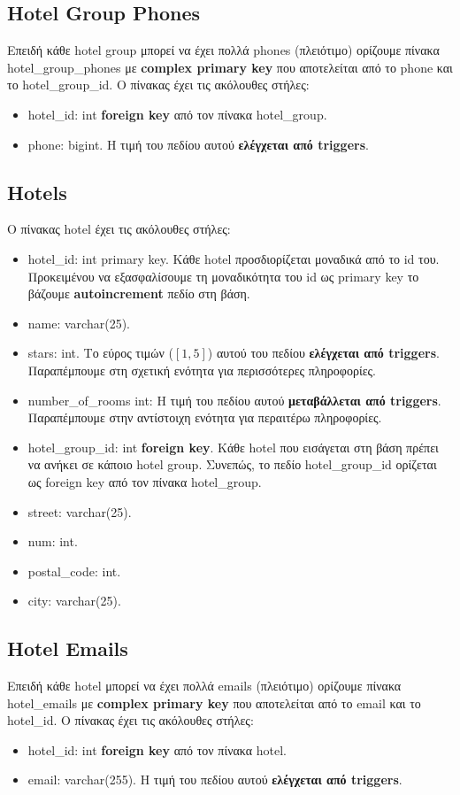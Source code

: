\documentclass[a4paper,oneside, 11pt]{article}
\begin{document}
\subsection{Hotel Group Phones}
Επειδή κάθε hotel group μπορεί να έχει πολλά phones (πλειότιμο) ορίζουμε πίνακα hotel\_group\_phones με \textbf{complex primary key} που αποτελείται από το phone και το hotel\_group\_id. Ο πίνακας έχει τις ακόλουθες στήλες:
\begin{itemize}
\item hotel\_id: int \textbf{foreign key} από τον πίνακα hotel\_group.
\item phone: bigint. Η τιμή του πεδίου αυτού \textbf{ελέγχεται από triggers}.
\end{itemize}
\subsection{Hotels}
Ο πίνακας hotel έχει τις ακόλουθες στήλες:
\begin{itemize}
\item hotel\_id: int primary key. Κάθε hotel προσδιορίζεται μοναδικά από το id του. Προκειμένου να εξασφαλίσουμε τη μοναδικότητα του id ως primary key το βάζουμε \textbf{autoincrement} πεδίο στη βάση.
\item name: varchar(25). 
\item stars: int. Το εύρος τιμών ($[1,5]$) αυτού του πεδίου \textbf{ελέγχεται από triggers}. Παραπέμπουμε στη σχετική ενότητα για περισσότερες πληροφορίες.
\item number\_of\_rooms int: Η τιμή του πεδίου αυτού \textbf{μεταβάλλεται από triggers}. Παραπέμπουμε στην αντίστοιχη ενότητα για περαιτέρω πληροφορίες.
\item hotel\_group\_id: int \textbf{foreign key}. Κάθε hotel που εισάγεται στη βάση πρέπει να ανήκει σε κάποιο hotel group. Συνεπώς, το πεδίο hotel\_group\_id ορίζεται ως foreign key από τον πίνακα hotel\_group.
\item street: varchar(25).
\item num: int.
\item postal\_code: int.
\item city: varchar(25).
\end{itemize}

\subsection{Hotel Emails}
Επειδή κάθε hotel μπορεί να έχει πολλά emails (πλειότιμο) ορίζουμε πίνακα hotel\_emails με \textbf{complex primary key} που αποτελείται από το email και το hotel\_id. Ο πίνακας έχει τις ακόλουθες στήλες:
\begin{itemize}
\item hotel\_id: int \textbf{foreign key} από τον πίνακα hotel.
\item email: varchar(255). Η τιμή του πεδίου αυτού \textbf{ελέγχεται από triggers}.
\end{itemize}
\end{document}
